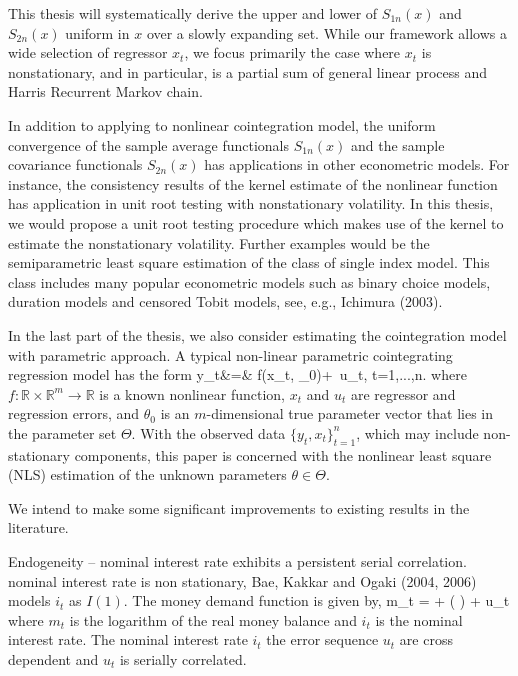 This thesis will systematically derive the upper and lower of $S_{1n}(x)$ and $S_{2n}(x)$ uniform in $x$ over a slowly expanding set. While our framework allows a wide selection of regressor $x_t$, we focus primarily the case where $x_t$ is nonstationary, and in particular, is a partial sum of general linear process and Harris Recurrent Markov chain.








In addition to applying to nonlinear cointegration model, the uniform convergence of the sample average functionals $S_{1n}(x)$ and the sample covariance functionals $S_{2n}(x)$ has applications in other econometric models. For instance, the consistency results of the kernel estimate of the nonlinear function has application in unit root testing with nonstationary volatility. In this thesis, we would propose a unit root testing procedure which makes use of the kernel to estimate the nonstationary volatility. Further examples would be the semiparametric least square estimation of the class of single index model. This class includes many popular econometric models such as binary choice models, duration models and censored Tobit models, see, e.g., Ichimura (2003).

In the last part of the thesis, we also consider estimating the cointegration model with parametric approach. A typical non-linear parametric cointegrating
regression model has the form
 \be y_t&=&
f(x_t, \theta_0)+\,  u_t, \quad t=1,...,n.
\ee
where  $f:\mathbb{R} \times \mathbb{R}^m \rightarrow \mathbb{R}$ is a known nonlinear function,
$x_t$ and  $u_t$ are regressor and regression errors, and   $\theta_0$ is an $m$-dimensional true parameter vector that lies in the parameter set $\Theta$. With the observed data $\{y_t, x_t\}_{t=1}^n$, which may include non-stationary components, this paper is concerned with the nonlinear least square (NLS) estimation of the unknown parameters $\theta\in \Theta$.

We intend to make some significant improvements to existing results in the literature.

Endogeneity -- nominal interest rate exhibits a persistent serial correlation. nominal interest rate is non stationary, Bae, Kakkar and Ogaki (2004, 2006) models $i_t$ as $I(1)$. The money demand function is given by,
\be
m_t = \al + \beta \log \big (  \big ) + u_t
\ee
where $m_t$ is the logarithm of the real money balance and $i_t$ is the nominal interest rate. The nominal interest rate $i_t$ the error sequence $u_t$ are cross dependent and $u_t$ is serially correlated.




